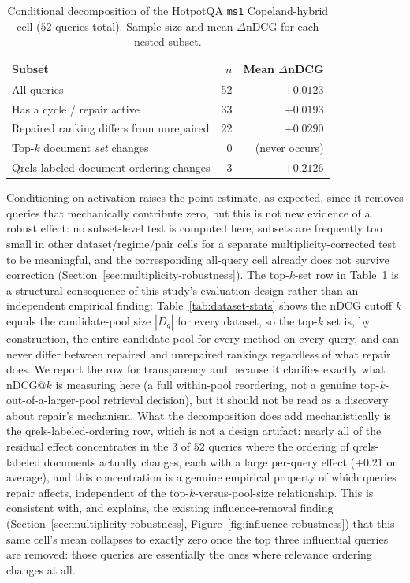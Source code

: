 \documentclass[manuscript,anonymous,review]{acmart}
\begin{document}
\begin{table}[t]
  \caption{Conditional decomposition of the HotpotQA \texttt{ms1}
    Copeland-hybrid cell ($52$ queries total). Sample size and mean
    $\Delta$nDCG for each nested subset.}
  \label{tab:conditional-hotpotqa}
  \scriptsize
  \begin{tabular}{lrr}
    \toprule
    Subset & $n$ & Mean $\Delta$nDCG \\
    \midrule
    All queries                                   & 52 & $+0.0123$ \\
    Has a cycle / repair active                    & 33 & $+0.0193$ \\
    Repaired ranking differs from unrepaired       & 22 & $+0.0290$ \\
    Top-$k$ document \emph{set} changes            & 0  & (never occurs) \\
    Qrels-labeled document ordering changes         & 3  & $+0.2126$ \\
    \bottomrule
  \end{tabular}
\end{table}

Conditioning on activation raises the point estimate, as expected, since it
removes queries that mechanically contribute zero, but this is not new
evidence of a robust effect: no subset-level test is computed here, subsets
are frequently too small in other dataset/regime/pair cells for a
separate multiplicity-corrected test to be meaningful, and the corresponding
all-query cell already does not survive correction
(Section~\ref{sec:multiplicity-robustness}). The top-$k$-set row in
Table~\ref{tab:conditional-hotpotqa} is a structural consequence of this
study's evaluation design rather than an independent empirical finding:
Table~\ref{tab:dataset-stats} shows the nDCG cutoff $k$ equals the
candidate-pool size $|D_q|$ for every dataset, so the top-$k$ set is, by
construction, the entire candidate pool for every method on every query,
and can never differ between repaired and unrepaired rankings regardless of
what repair does. We report the row for transparency and because it
clarifies exactly what nDCG@$k$ is measuring here (a full within-pool
reordering, not a genuine top-$k$-out-of-a-larger-pool retrieval decision),
but it should not be read as a discovery about repair's mechanism. What the
decomposition does add mechanistically is the qrels-labeled-ordering row,
which is not a design artifact: nearly all of the residual effect
concentrates in the $3$ of $52$ queries where the ordering of qrels-labeled
documents actually changes, each with a large per-query effect ($+0.21$ on
average), and this concentration is a genuine empirical property of which
queries repair affects, independent of the top-$k$-versus-pool-size
relationship. This is consistent with, and explains, the
existing influence-removal finding
(Section~\ref{sec:multiplicity-robustness}, Figure~\ref{fig:influence-robustness})
that this same cell's mean collapses to exactly zero once the top three
influential queries are removed: those queries are essentially the ones
where relevance ordering changes at all.
\end{document}
